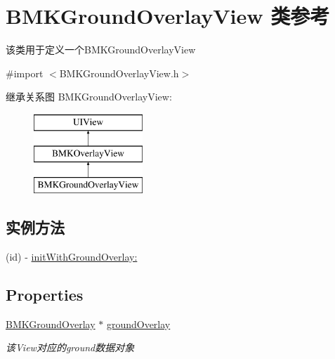 \hypertarget{interface_b_m_k_ground_overlay_view}{\section{B\-M\-K\-Ground\-Overlay\-View 类参考}
\label{interface_b_m_k_ground_overlay_view}
}


该类用于定义一个\-B\-M\-K\-Ground\-Overlay\-View  




{\ttfamily \#import $<$B\-M\-K\-Ground\-Overlay\-View.\-h$>$}

继承关系图 B\-M\-K\-Ground\-Overlay\-View\-:\begin{figure}[H]
\begin{center}
\leavevmode
\includegraphics[height=3.000000cm]{interface_b_m_k_ground_overlay_view}
\end{center}
\end{figure}
\subsection*{实例方法}
\begin{DoxyCompactItemize}
\item 
(id) -\/ \hyperlink{interface_b_m_k_ground_overlay_view_a9a2e7f5341b40608aff7e8e70f219800}{init\-With\-Ground\-Overlay\-:}
\end{DoxyCompactItemize}
\subsection*{Properties}
\begin{DoxyCompactItemize}
\item 
\hypertarget{interface_b_m_k_ground_overlay_view_afe3e5c81b5ba3b9a47dda8d3593fd8f2}{\hyperlink{interface_b_m_k_ground_overlay}{B\-M\-K\-Ground\-Overlay} $\ast$ \hyperlink{interface_b_m_k_ground_overlay_view_afe3e5c81b5ba3b9a47dda8d3593fd8f2}{ground\-Overlay}}\label{interface_b_m_k_ground_overlay_view_afe3e5c81b5ba3b9a47dda8d3593fd8f2}

\begin{DoxyCompactList}\small\item\em 该\-View对应的ground数据对象 \end{DoxyCompactList}\end{DoxyCompactItemize}
